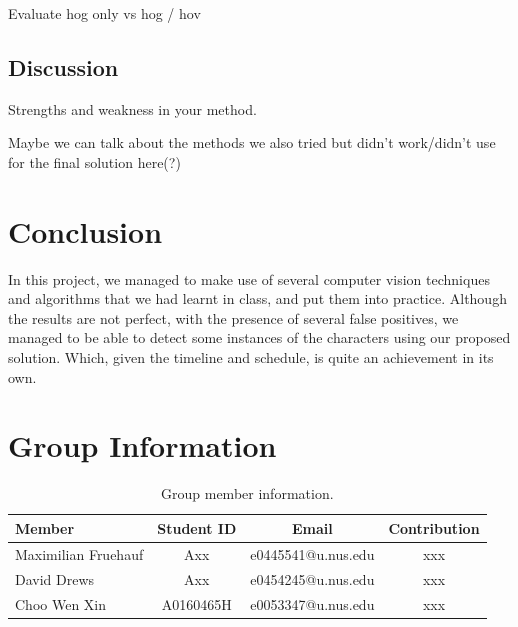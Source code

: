\documentclass[11pt]{article}
\begin{document}
Evaluate hog only vs hog / hov
\subsection{Discussion}
Strengths and weakness in your method.

Maybe we can talk about the methods we also tried but didn't work/didn't use for the final solution here(?)

\section{Conclusion}
In this project, we managed to make use of several computer vision techniques and algorithms that we had learnt in class, and put them into practice. Although the results are not perfect, with the presence of several false positives, we managed to be able to detect some instances of the characters using our proposed solution. Which, given the timeline and schedule, is quite an achievement in its own.

\section{Group Information}
\begin{table}[ht]
    \centering
    \begin{tabular}{lccc}
    \toprule
     Member & Student ID & Email & Contribution\\
    \midrule
    Maximilian Fruehauf& Axx & e0445541@u.nus.edu & xxx \\
    David Drews& Axx &e0454245@u.nus.edu & xxx  \\
    Choo Wen Xin& A0160465H & e0053347@u.nus.edu & xxx  \\
    \bottomrule
    \end{tabular}
    \caption{Group member information.}
    \label{tab:dataset}
\end{table}




 
\end{document}
